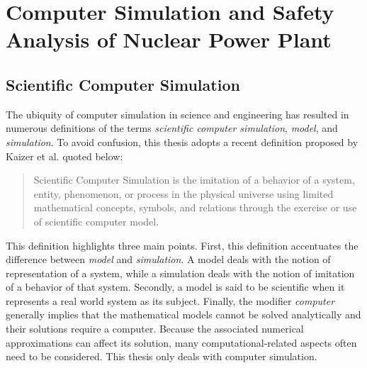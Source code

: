 \section{Computer Simulation and Safety Analysis of Nuclear Power Plant}\label{sec:intro_computer_simulation}

\subsection{Scientific Computer Simulation}\label{sub:intro_scientific_computer_simulation}

The ubiquity of computer simulation in science and engineering has resulted in numerous definitions of the terms \textit{scientific computer simulation}, \textit{model}, and \textit{simulation}.
To avoid confusion, this thesis adopts a recent definition proposed by Kaizer et al.\cite{Kaizer2015} quoted below:
\begin{quote}
	Scientific Computer Simulation is the imitation of a behavior of a system, entity, phenomenon, or process in the physical universe 
	using limited mathematical concepts, symbols, and relations through the exercise or use of scientific computer model.
\end{quote}

This definition highlights three main points.
First, this definition accentuates the difference between \emph{model} and \emph{simulation}.
A model deals with the notion of representation of a system, while a simulation deals with the notion of imitation of a behavior of that system.
Secondly, a model is said to be scientific when it represents a real world system as its subject.
Finally, the modifier \emph{computer} generally implies that the mathematical models cannot be solved analytically and their solutions require a computer.
Because the associated numerical approximations can affect its solution, many computational-related aspects often need to be considered.
This thesis only deals with computer simulation.

